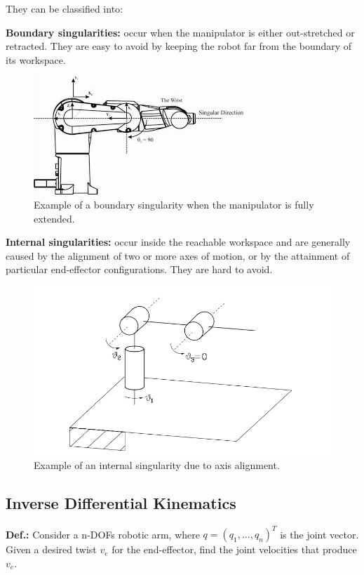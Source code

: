 They can be classified into:

\textbf{Boundary singularities:} occur when the manipulator is either out-stretched or retracted. They are easy to avoid by keeping the robot far from the boundary of its workspace.

\begin{figure}[H]
    \centering
    \includegraphics[width=0.6\linewidth]{imgs/boundary_singularity.png}
    \caption{Example of a boundary singularity when the manipulator is fully extended.}
\end{figure}

\textbf{Internal singularities:} occur inside the reachable workspace and are generally caused by the alignment of two or more axes of motion, or by the attainment of particular end-effector configurations. They are hard to avoid.

\begin{figure}[H]
    \centering
    \includegraphics[width=0.6\linewidth]{imgs/internal_singularity.png}
    \caption{Example of an internal singularity due to axis alignment.}
\end{figure}

\hfill

\subsection{Inverse Differential Kinematics}

\textbf{Def.:} Consider a n-DOFs robotic arm, where $q = (q_1, \dots, q_n)^T$ is the joint vector. Given a desired twist $v_e$ for the end-effector, find the joint velocities that produce $v_e$.

